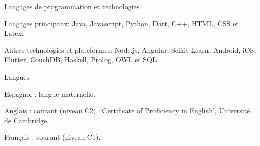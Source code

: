 

\begin{cventries}

\cventry
{Langages de programmation et technologies} %
{} %
{} %
{} %
{
  \begin{cvitems} %
    \item Langages principaux: Java, Javascript, Python, Dart, C++, HTML, CSS et Latex.
    \item Autres technologies et plateformes: Node.js, Angular, Scikit Learn, Android, iOS, Flutter, CouchDB, Haskell, Prolog, OWL et SQL.
  \end{cvitems}
}

\cventry
{Langues} %
{} %
{} %
{} %
{
  \begin{cvitems} %
    \item Espagnol : langue maternelle. 
    \item Anglais : courant (niveau C2), `Certificate of Proficiency in English', Université de Cambridge.
    \item Français : courant (niveau C1).
  \end{cvitems}
}

\end{cventries}
